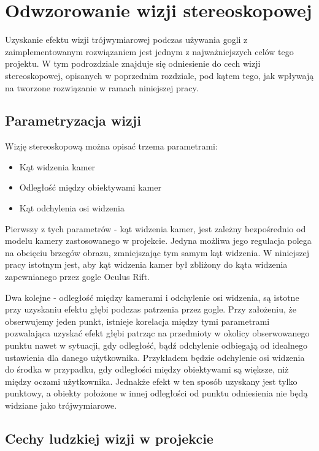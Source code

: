 \documentclass[a4paper,11pt,twoside]{report}
\theoremstyle{definition}
\begin{document}
\section{Odwzorowanie wizji stereoskopowej}

Uzyskanie efektu wizji trójwymiarowej podczas używania gogli z zaimplementowanym rozwiązaniem jest jednym z najważniejszych celów tego projektu. W tym podrozdziale znajduje się odniesienie do cech wizji stereoskopowej, opisanych w poprzednim rozdziale, pod kątem tego, jak wpływają na tworzone rozwiązanie w ramach niniejszej pracy. 

\subsection{Parametryzacja wizji}
Wizję stereoskopową można opisać trzema parametrami:
\begin{itemize}
\item Kąt widzenia kamer
\item Odległość między obiektywami kamer
\item Kąt odchylenia osi widzenia
\end{itemize}

Pierwszy z tych parametrów - kąt widzenia kamer, jest zależny bezpośrednio od modelu kamery zastosowanego w projekcie. Jedyna możliwa jego regulacja polega na obcięciu brzegów obrazu, zmniejszając tym samym kąt widzenia. W niniejszej pracy istotnym jest, aby kąt widzenia kamer był zbliżony do kąta widzenia zapewnianego przez gogle Oculus Rift.

Dwa kolejne - odległość między kamerami i odchylenie osi widzenia, są istotne przy uzyskaniu efektu głębi podczas patrzenia przez gogle. Przy założeniu, że obserwujemy jeden punkt, istnieje korelacja między tymi parametrami pozwalająca uzyskać efekt głębi patrząc na przedmioty w okolicy obserwowanego punktu nawet w sytuacji, gdy odległość, bądź odchylenie odbiegają od idealnego ustawienia dla danego użytkownika. Przykładem będzie odchylenie osi widzenia do środka w przypadku, gdy odległości między obiektywami są większe, niż między oczami użytkownika. Jednakże efekt w ten sposób uzyskany jest tylko punktowy, a obiekty położone w innej odległości od punktu odniesienia nie będą widziane jako trójwymiarowe.

\subsection{Cechy ludzkiej wizji w projekcie}
\end{document}
